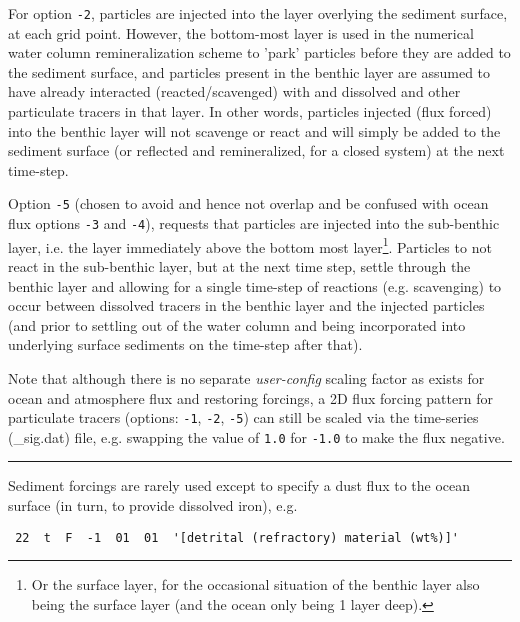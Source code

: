 For option \texttt{-2}, particles are injected into the layer overlying the sediment surface, at each grid point. However, the bottom-most layer is used in the numerical water column remineralization scheme to 'park' particles before they are added to the sediment surface, and particles present in the benthic layer are assumed to have already interacted (reacted/scavenged) with and dissolved and other particulate tracers in that layer. In other words, particles injected (flux forced) into the benthic layer will not scavenge or react and will simply be added to the sediment surface (or reflected and remineralized, for a closed system) at the next time-step.

Option \texttt{-5} (chosen to avoid and hence not overlap and be confused with ocean flux options \texttt{-3} and \texttt{-4}), requests that particles are injected into the sub-benthic layer, i.e. the layer immediately above the bottom most layer\footnote{Or the surface layer, for the occasional situation of the benthic layer also being the surface layer (and the ocean only being 1 layer deep).}. Particles to not react in the sub-benthic layer, but at the next time step, settle through the benthic layer and allowing  for a single time-step of reactions (e.g. scavenging) to occur between dissolved tracers in the benthic layer and the injected particles (and prior to settling out of the water column and being incorporated into underlying surface sediments on the time-step after that).

Note that although there is no separate \textit{user-config} scaling factor as exists for ocean and atmosphere flux and restoring forcings, a 2D flux forcing pattern for particulate tracers (options: \texttt{-1}, \texttt{-2}, \texttt{-5}) can still be scaled via the time-series (\textsf{\footnotesize *\_sig.dat}) file, e.g. swapping the value of \texttt{1.0} for \texttt{-1.0} to make the flux negative.

\vspace{1mm}
\noindent\rule{4cm}{0.5pt}
\vspace{2mm}

\noindent Sediment forcings are rarely used except to specify a dust flux to the ocean surface (in turn, to provide dissolved iron), e.g.

\vspace{-2mm}\footnotesize\begin{verbatim}
 22  t  F  -1  01  01  '[detrital (refractory) material (wt%)]'
\end{verbatim}\normalsize\vspace{-2mm}
 
